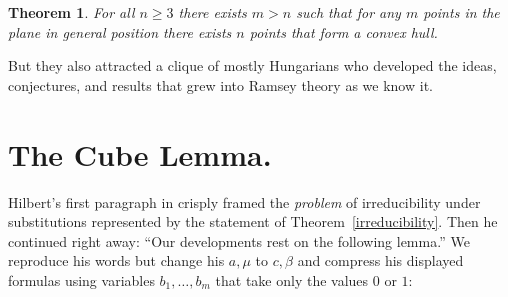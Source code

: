 \documentclass{article}
\theoremstyle{plain}
\newtheorem{thm}{Theorem}
\theoremstyle{definition}
\begin{document}
\begin{thm}
For all $n\ge 3$ there exists $m > n$ such that for any $m$ points in the plane
in general position there exists $n$ points that form a convex hull.
\end{thm}

\noindent
But they also 
attracted a clique of mostly Hungarians who developed the ideas, conjectures, and results that grew into Ramsey theory as we know it.



\section{The Cube Lemma.}
\label{sec:cube-lemma}

Hilbert's first paragraph in \cite{Hilbert1892} crisply framed the \emph{problem} of
irreducibility under substitutions represented by the statement of
Theorem~\ref{irreducibility}. Then he continued right away: ``Our
developments rest on the following lemma.'' We reproduce his words but
change his $a,\mu$ to $c,\beta$ and compress his displayed formulas
using variables $b_1,\dots,b_m$ that take only the values $0$ or $1$:


\end{document}
